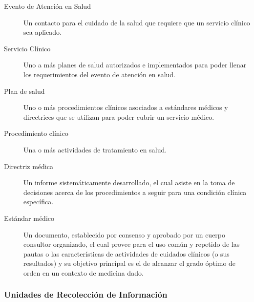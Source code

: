 \begin{description}
\item[Evento de Atención en Salud]
Un contacto para el cuidado de la salud que requiere que un servicio clínico sea aplicado.

\item [Servicio Clínico]
Uno a más planes de salud autorizados e implementados para poder llenar los requerimientos del evento de atención en salud.

\item [Plan de salud]
Uno o más procedimientos clínicos asociados a estándares médicos y directrices que se utilizan para poder cubrir un servicio médico.

\item [Procedimiento clínico]
Una o más actividades de tratamiento en salud.

\item [Directriz médica]
Un informe sistemáticamente desarrollado, el cual asiste en la toma de decisiones acerca de los procedimientos a seguir para una condición clínica específica. 

\item [Estándar médico] 
Un documento, establecido por consenso y aprobado por un cuerpo consultor organizado, el cual provee para el uso común y repetido de las pautas o las características de actividades de cuidados clínicos (o sus resultados)  y su objetivo principal es el de alcanzar el grado óptimo de orden en un contexto de medicina dado.
\end{description}

\subsubsection{Unidades de Recolección de Información}


